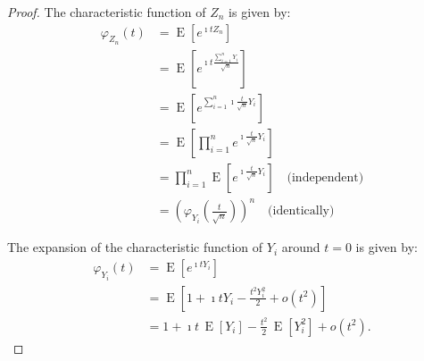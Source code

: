 \documentclass[10pt, headings=standardclasses, parskip=half, twoside]{scrartcl}
\begin{document}
\begin{proof}
The characteristic function of $Z_{n}$ is given by:
\begin{align*}
    \varphi_{Z_{n}}(t) &= \operatorname{E}\left[e^{\imath t Z_{n}}\right] \\
    &= \operatorname{E}\left[e^{\imath t \frac{\sum_{i=1}^{n} Y_{i}}{\sqrt{n}}}\right] \\
    &= \operatorname{E}\left[e^{\sum_{i=1}^{n} \imath \frac{t}{\sqrt{n}} Y_{i}}\right] \\
    &= \operatorname{E}\left[\prod_{i=1}^{n} e^{\imath \frac{t}{\sqrt{n}} Y_{i}}\right] \\
    &= \prod_{i=1}^{n} \operatorname{E}\left[e^{\imath \frac{t}{\sqrt{n}}Y_{i}}\right] \quad \text{(independent)} \\
    &= \left(\varphi_{Y_{i}}\left(\frac{t}{\sqrt{n}}\right)\right)^{n} \quad \text{(identically)}
\end{align*}


The expansion of the characteristic function of $Y_{i}$ around $t=0$ is given by:
\begin{align*}
    \varphi_{Y_{i}}(t) &= \operatorname{E}\left[e^{\imath t Y_{i}}\right] \\
    &= \operatorname{E}\left[1 + \imath t Y_{i} - \frac{t^2 Y_{i}^2}{2} + o(t^2)\right] \\
    &= 1 + \imath t\,\operatorname{E}\left[Y_{i}\right] - \frac{t^2}{2}\,\operatorname{E}\left[Y_{i}^2\right] + o(t^2).
\end{align*}


\end{proof}
\end{document}
